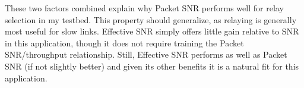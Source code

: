 These two factors combined explain why Packet SNR performs well for relay selection in my testbed. This property should generalize, as relaying is generally most useful for slow links. Effective SNR simply offers little gain relative to SNR in this application, though it does not require training the Packet SNR/throughput relationship. Still, Effective SNR performs as well as Packet SNR (if not slightly better) and given its other benefits it is a natural fit for this application. %

%
